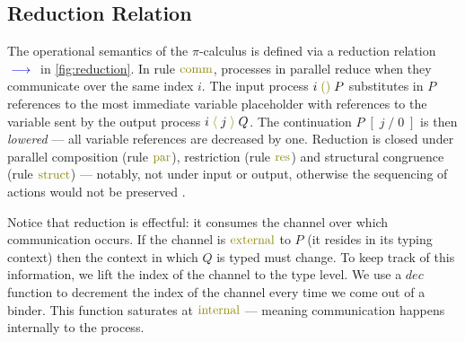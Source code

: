 \documentclass[a4paper,UKenglish,cleveref, autoref, thm-restate,authorcolumns]{lipics-v2019}
\theoremstyle{definition}
\newcommand{\picalc}{$\pi$-calculus}
\newcommand{\type}[1]{\textcolor{blue}{\operatorname{#1}}}
\newcommand{\constr}[1]{\textcolor{olive}{\operatorname{#1}}}
\newcommand{\send}[2]{#1 \; \constr{\langle} \; #2 \;\constr{\rangle} \;}
\newcommand{\recv}[1]{#1 \; \constr{\mathbb{()}} \;}
\newcommand{\subst}[3]{#1 \; [ \; #2 \; / \;#3 \;]}
\newcommand{\reduce}[1]{\; \type{\longrightarrow}_{#1} \;}
\begin{document}
\subsection{Reduction Relation}
\label{operational-semantics}

The operational semantics of the \picalc{} is defined via a reduction relation $\reduce{}$ in \autoref{fig:reduction}.
In rule $\constr{comm}$, processes in parallel reduce when they communicate over the same index ${i}$.
The input process $\recv{i}P$ substitutes in $P$ references to the most immediate variable placeholder with references to the variable sent by the output process $\send{i}{j}{Q}$.
The continuation $\subst{P}{j}{0}$ is then \emph{lowered} --- all variable references are decreased by one.
Reduction is closed under parallel composition (rule $\constr{par}$), restriction (rule $\constr{res}$) and structural congruence (rule $\constr{struct}$) 
--- notably, not under input or output, otherwise the sequencing of actions would not be preserved \cite{Sangio01}.

Notice that reduction is effectful: it consumes the channel over which communication occurs.
If the channel is $\constr{external}$ to $P$ (it resides in its typing context) then the context in which $Q$ is typed must change.
To keep track of this information, we lift the index of the channel to the type level.
We use a $dec$ function to decrement the index of the channel every time we come out of a binder.
This function saturates at $\constr{internal}$ --- meaning communication happens internally to the process.
\end{document}
